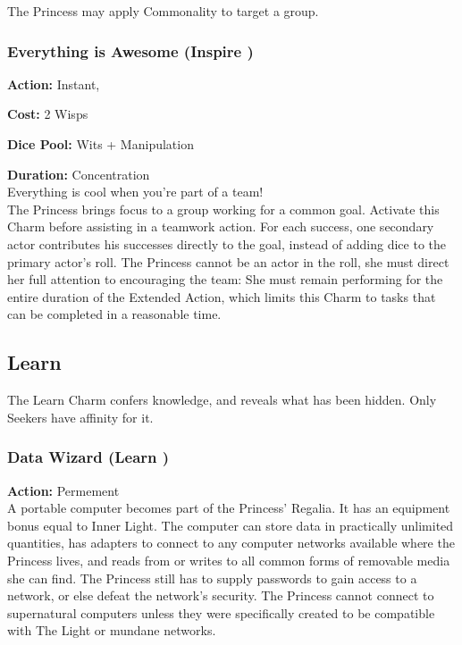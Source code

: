 The Princess may apply Commonality to target a group. 

\subsubsection*{Everything is Awesome (Inspire \textbullet\textbullet\textbullet\textbullet\textbullet)}

\noindent \textbf{Action:} Instant,

\noindent \textbf{Cost:} 2 Wisps

\noindent \textbf{Dice Pool:} Wits + Manipulation

\noindent \textbf{Duration:} Concentration \\ 

\noindent  Everything is cool when you're part of a team!\\

\noindent The Princess brings focus to a group working for a common goal. Activate this Charm before assisting in a teamwork action. For each success, one secondary actor contributes his successes directly to the goal, instead of adding dice to the primary actor's roll. The Princess cannot be an actor in the roll, she must direct her full attention to encouraging the team: She must remain performing for the entire duration of the Extended Action, which limits this Charm to tasks that can be completed in a reasonable time.  

\subsection*{Learn}
\label{subsec:Learn}
The Learn Charm confers knowledge, and reveals what has been hidden. Only Seekers have affinity for it.

\subsubsection*{Data Wizard (Learn \textbullet)}

\noindent \textbf{Action:} Permement \\

\noindent A portable computer becomes part of the Princess’ Regalia. It has an equipment bonus equal to Inner Light. The computer can store data in practically unlimited quantities, has adapters to connect to any computer networks available where the Princess lives, and reads from or writes to all common forms of removable media she can find. The Princess still has to supply passwords to gain access to a network, or else defeat the network’s security. The Princess cannot connect to supernatural computers unless they were specifically created to be compatible with The Light or mundane networks. 

